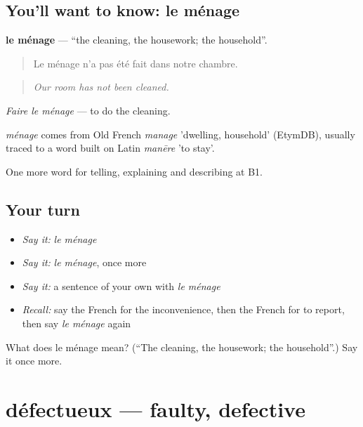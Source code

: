 \subsection*{You'll want to know: le ménage}
\textbf{le ménage} — \textquotedblleft{}the cleaning, the housework; the household\textquotedblright{}.

\begin{quote}
Le ménage n'a pas été fait dans notre chambre.
\end{quote}

\begin{quote}
\emph{Our room has not been cleaned.}
\end{quote}

\emph{Faire le ménage} — to do the cleaning.

\begin{cousinweb}
\emph{ménage} comes from Old French \emph{manage} 'dwelling, household' (EtymDB), usually traced to a word built on Latin \emph{manēre} 'to stay'.
\end{cousinweb}

\begin{grammarlens}[title={What you've built}]
One more word for telling, explaining and describing at B1.
\end{grammarlens}

\subsection*{Your turn}
\begin{itemize}
\raggedright
  \item \emph{Say it:} \emph{le ménage}
  \item \emph{Say it:} \emph{le ménage}, once more
  \item \emph{Say it:} a sentence of your own with \emph{le ménage}
  \item \emph{Recall:} say the French for the inconvenience, then the French for to report, then say \emph{le ménage} again
\end{itemize}

\begin{tcolorbox}[breakable,colback=teal!4,colframe=teal!35!black,title={Before you move on}]
What does le ménage mean? (\textquotedblleft{}The cleaning, the housework; the household\textquotedblright{}.) Say it once more.
\end{tcolorbox}
\section[défectueux]{défectueux — faulty, defective}

